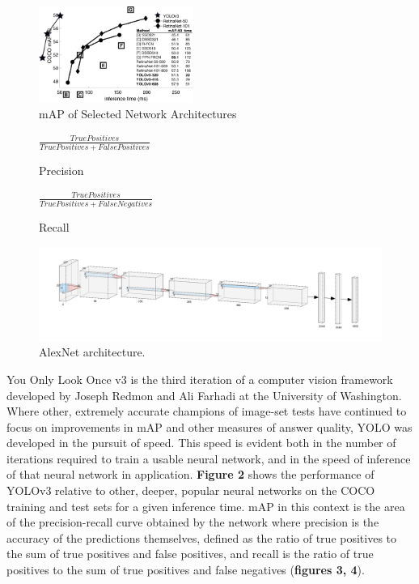 \documentclass[sigconf]{acmart}
\begin{document}
\begin{figure}
  \includegraphics[width=0.45\textwidth]{map50blue.PNG}
  \caption{mAP of Selected Network Architectures}
  \label{fig:iterchart}
\end{figure}
\begin{figure}
  $\frac{True Positives}{True Positives + False Positives}$
  \caption{Precision}
  \label{fig:ap}
\end{figure}
\begin{figure}
  $\frac{True Positives}{True Positives + False Negatives}$
  \caption{Recall}
  \label{fig:rec}
\end{figure}
\begin{figure}[h]
  \includegraphics[width=\textwidth]{alexnetflat.PNG}
  \caption{AlexNet architecture.}
  \label{fig:alex}
\end{figure}

You Only Look Once v3 is the third iteration of a computer vision framework developed by Joseph Redmon and Ali Farhadi at the University of Washington. \cite{YOLO} Where other, extremely accurate champions of image-set tests have continued to focus on improvements in mAP and other measures of answer quality, YOLO was developed in the pursuit of speed. This speed is evident both in the number of iterations required to train a usable neural network, and in the speed of inference of that neural network in application. \cite{YOLO} \textbf{Figure 2} shows the performance of YOLOv3 relative to other, deeper, popular neural networks on the COCO training and test sets for a given inference time. mAP in this context is the area of the precision-recall curve obtained by the network where precision is the accuracy of the predictions themselves, defined as the ratio of true positives to the sum of true positives and false positives, and recall is the ratio of true positives to the sum of true positives and false negatives (\textbf{figures 3, 4}).
\end{document}
